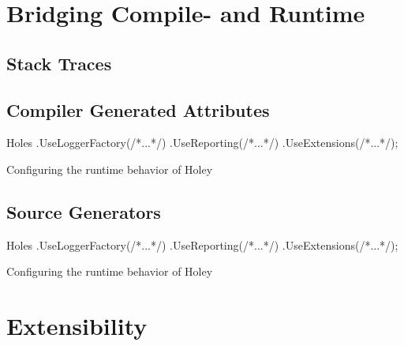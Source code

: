 \section{Bridging Compile- and Runtime}

\subsection{Stack Traces}

\subsection{Compiler Generated Attributes}

\begin{program}[ht]
\begin{CsCode}
Holes
	.UseLoggerFactory(/*...*/)
	.UseReporting(/*...*/)
	.UseExtensions(/*...*/);
\end{CsCode}
\caption{Configuring the runtime behavior of Holey}
\label{prg:holey-enabling-configuration}
\end{program}

\subsection{Source Generators}
\label{sec:source-generators}

\begin{program}[ht]
\begin{CsCode}
Holes
	.UseLoggerFactory(/*...*/)
	.UseReporting(/*...*/)
	.UseExtensions(/*...*/);
\end{CsCode}
\caption{Configuring the runtime behavior of Holey}
\label{prg:holey-enabling-configuration}
\end{program}

\section{Extensibility}


